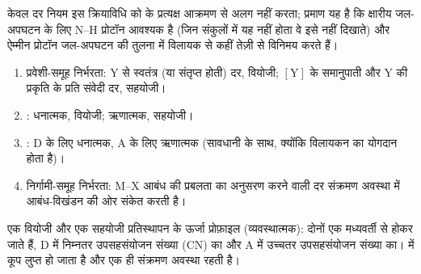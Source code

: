 केवल दर नियम इस क्रियाविधि को  के प्रत्यक्ष आक्रमण से
अलग नहीं करता; प्रमाण यह है कि क्षारीय जल-अपघटन के लिए N--H प्रोटॉन आवश्यक है (जिन संकुलों में
यह नहीं होता वे इसे नहीं दिखाते) और ऐम्मीन प्रोटॉन जल-अपघटन की तुलना में विलायक से कहीं
तेज़ी से विनिमय करते हैं।

\begin{method}[प्रतिस्थापन क्रियाविधि का निदान]\label{met:b3:complex-mechanisms:diagnose}
\begin{enumerate}
  \item प्रवेशी-समूह निर्भरता: Y से स्वतंत्र (या संतृप्त होती) दर,
        वियोजी; $[\mathrm Y]$ के समानुपाती और Y की प्रकृति के प्रति संवेदी दर,
        सहयोजी।
  \item {}: धनात्मक, वियोजी; ऋणात्मक, सहयोजी।
  \item {}: D के लिए धनात्मक, A के लिए ऋणात्मक (सावधानी के साथ, क्योंकि
        विलायकन का योगदान होता है)।
  \item निर्गामी-समूह निर्भरता: M--X आबंध की प्रबलता का अनुसरण करने वाली दर
        संक्रमण अवस्था में आबंध-विखंडन की ओर संकेत करती है।
\end{enumerate}
\end{method}

\begin{omfigure}

{\small एक वियोजी और एक सहयोजी प्रतिस्थापन के ऊर्जा प्रोफ़ाइल
(व्यवस्थात्मक): दोनों एक मध्यवर्ती से होकर जाते हैं, D में निम्नतर उपसहसंयोजन संख्या
(CN) का और A में उच्चतर उपसहसंयोजन संख्या का।  में
कूप लुप्त हो जाता है और एक ही संक्रमण अवस्था रहती है।}
\end{omfigure}

